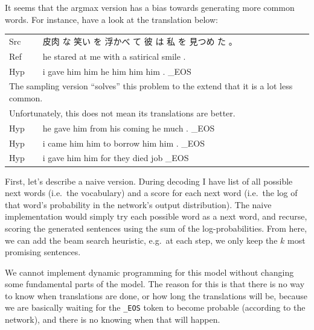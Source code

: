 \documentclass[answers]{exam}
\begin{document}
\begin{CJK}{UTF8}{min}
\begin{questions}
\begin{framed}
\begin{compactenum}[1.]
\item
  It seems that the argmax version has a bias towards generating more common
  words. For instance, have a look at the translation below:\\
  \begin{tabular}{ll}
    Src & 皮肉 な 笑い を 浮かべ て 彼 は 私 を 見つめ た 。\\
    Ref & he stared at me with a satirical smile .\\
    Hyp & i gave him him he him him him . \_EOS\\
    \multicolumn{2}{l}{%
    The sampling version ``solves'' this problem to the extend that it is a lot less common.
    }\\
    \multicolumn{2}{l}{%
    Unfortunately, this does not mean its translations are better.
    }\\
    Hyp & he gave him from his coming he much . \_EOS\\
    Hyp & i came him him to borrow him him . \_EOS\\
    Hyp & i gave him him for they died job \_EOS
  \end{tabular}
  \item
    First, let's describe a naive version. During decoding I have list of all
    possible next words (i.e.\ the vocabulary) and a score for each next word
    (i.e.\ the log of that word's probability in the network's output
    distribution).
    The naive implementation would simply try each possible word as a next word,
    and recurse, scoring the generated sentences using the sum of the
    log-probabilities. 
    From here, we can add the beam search heuristic, e.g.\ at each step, we only
    keep the $k$ most promising sentences.
  \item
    We cannot implement dynamic programming for this model without changing some
    fundamental parts of the model. The reason for this is that there is no way
    to know when translations are done, or how long the translations will be,
    because we are basically waiting for the \texttt{\_EOS} token to become
    probable (according to the network), and there is no knowing when that will
    happen. 
\end{compactenum}
\end{framed}



\end{questions}
\end{CJK}
\end{document}
